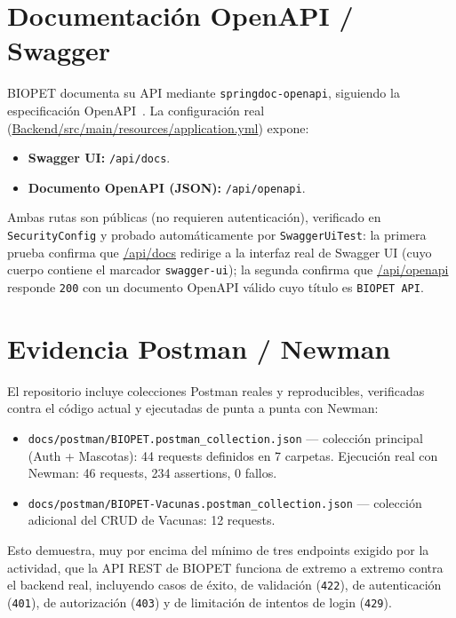 \section{Documentaci\'on OpenAPI / Swagger}
\label{sec:openapi-swagger}

BIOPET documenta su API mediante \texttt{springdoc-openapi}, siguiendo la
especificaci\'on OpenAPI~\parencite{openapi-spec}. La configuraci\'on real
(\url{Backend/src/main/resources/application.yml}) expone:

\begin{itemize}[nosep]
  \item \textbf{Swagger UI:} \texttt{/api/docs}.
  \item \textbf{Documento OpenAPI (JSON):} \texttt{/api/openapi}.
\end{itemize}

Ambas rutas son p\'ublicas (no requieren autenticaci\'on), verificado en
\texttt{SecurityConfig} y probado autom\'aticamente por
\texttt{SwaggerUiTest}: la primera prueba confirma que \url{/api/docs}
redirige a la interfaz real de Swagger UI (cuyo cuerpo contiene el
marcador \texttt{swagger-ui}); la segunda confirma que \url{/api/openapi}
responde \texttt{200} con un documento OpenAPI v\'alido cuyo t\'itulo es
\texttt{BIOPET API}.


\section{Evidencia Postman / Newman}
\label{sec:evidencia-postman}

El repositorio incluye colecciones Postman reales y reproducibles,
verificadas contra el c\'odigo actual y ejecutadas de punta a punta con
Newman:

\begin{itemize}[nosep]
  \item \texttt{docs/postman/BIOPET.postman\_collection.json} --- colecci\'on
    principal (Auth + Mascotas): 44 requests definidos en 7 carpetas.
    Ejecuci\'on real con Newman: 46 requests, 234 assertions, 0 fallos.
  \item \texttt{docs/postman/BIOPET-Vacunas.postman\_collection.json} ---
    colecci\'on adicional del CRUD de Vacunas: 12 requests.
\end{itemize}

Esto demuestra, muy por encima del m\'inimo de tres endpoints exigido por
la actividad, que la API REST de BIOPET funciona de extremo a extremo
contra el backend real, incluyendo casos de \'exito, de validaci\'on
(\texttt{422}), de autenticaci\'on (\texttt{401}), de autorizaci\'on
(\texttt{403}) y de limitaci\'on de intentos de login (\texttt{429}).
